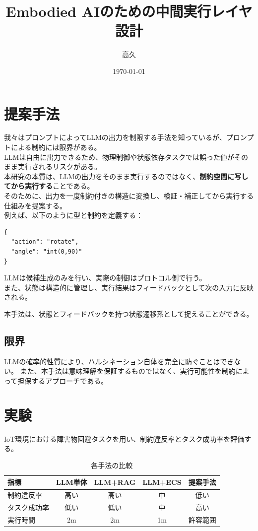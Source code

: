 \documentclass{article}
\title{Embodied AIのための中間実行レイヤ設計}
\author{高久}
\date{\today}
\begin{document}
\maketitle

\section{提案手法}

我々はプロンプトによってLLMの出力を制限する手法を知っているが、プロンプトによる制約には限界がある。\\
LLMは自由に出力できるため、物理制御や状態依存タスクでは誤った値がそのまま実行されるリスクがある。\\

本研究の本質は、LLMの出力をそのまま実行するのではなく、\textbf{制約空間に写してから実行する}ことである。\\  
そのために、出力を一度制約付きの構造に変換し、検証・補正してから実行する仕組みを提案する。\\
例えば、以下のように型と制約を定義する：

\begin{verbatim}
{
  "action": "rotate",
  "angle": "int(0,90)"
}
\end{verbatim}

LLMは候補生成のみを行い、実際の制御はプロトコル側で行う。\\
また、状態は構造的に管理し、実行結果はフィードバックとして次の入力に反映される。

本手法は、状態とフィードバックを持つ状態遷移系として捉えることができる。

\subsection{限界}

LLMの確率的性質により、ハルシネーション自体を完全に防ぐことはできない。  
また、本手法は意味理解を保証するものではなく、実行可能性を制約によって担保するアプローチである。

\section{実験}

IoT環境における障害物回避タスクを用い、制約違反率とタスク成功率を評価する。

\begin{table}[h]
\centering
\begin{tabular}{lcccc}
\hline
指標 & LLM単体 & LLM+RAG & LLM+ECS & 提案手法 \\
\hline
制約違反率 & 高い & 高い & 中 & 低い \\
タスク成功率 & 低い & 低い & 中 & 高い \\
実行時間 & 2m & 2m & 1m & 許容範囲 \\
\hline
\end{tabular}
\caption{各手法の比較}
\end{table}
\end{document}
